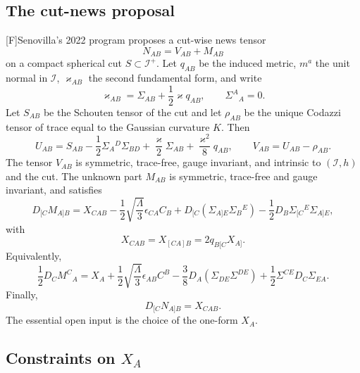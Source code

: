\documentclass[11pt,a4paper]{article}
\newcommand{\scri}{\mathscr{I}}
\newcommand{\statusF}{\textsf{[F]}}
\begin{document}
\subsection{The cut-news proposal}

\statusF Senovilla's 2022 program proposes a cut-wise news tensor
\begin{equation}\label{eq:N-decomposition}
  N_{AB}=V_{AB}+M_{AB}
\end{equation}
on a compact spherical cut \(S\subset\scri^+\).  Let \(q_{AB}\) be the induced metric, \(m^a\) the unit normal in \(\scri\), \(\varkappa_{AB}\) the second fundamental form, and write
\begin{equation}
  \varkappa_{AB}=\Sigma_{AB}+\frac12\varkappa q_{AB},
  \qquad \Sigma^A{}_A=0 .
\end{equation}
Let \(S_{AB}\) be the Schouten tensor of the cut and let \(\rho_{AB}\) be the unique Codazzi tensor of trace equal to the Gaussian curvature \(K\).  Then
\begin{equation}
  U_{AB}
  =
  S_{AB}
  -\frac12\Sigma_A{}^D\Sigma_{BD}
  +\frac{\varkappa}{2}\Sigma_{AB}
  +\frac{\varkappa^2}{8}q_{AB},
  \qquad
  V_{AB}=U_{AB}-\rho_{AB}.
\end{equation}
The tensor \(V_{AB}\) is symmetric, trace-free, gauge invariant, and intrinsic to \((\scri,h)\) and the cut.  The unknown part \(M_{AB}\) is symmetric, trace-free and gauge invariant, and satisfies
\begin{equation}
  D_{[C}M_{A]B}
  =
  X_{CAB}
  -\frac12\sqrt{\frac{\Lambda}{3}}\epsilon_{CA}C_B
  +D_{[C}\!\left(\Sigma_{A]E}\Sigma_B{}^E\right)
  -\frac12 D_B\Sigma_{[C}{}^E\Sigma_{A]E},
\end{equation}
with
\begin{equation}
  X_{CAB}=X_{[CA]B}=2q_{B[C}X_{A]} .
\end{equation}
Equivalently,
\begin{equation}\label{eq:X-source-div}
  \frac12 D_C M^C{}_A
  =
  X_A
  +\frac12\sqrt{\frac{\Lambda}{3}}\epsilon_{AB}C^B
  -\frac38 D_A(\Sigma_{DE}\Sigma^{DE})
  +\frac12\Sigma^{CE}D_C\Sigma_{EA}.
\end{equation}
Finally,
\begin{equation}
  D_{[C}N_{A]B}=X_{CAB}.
\end{equation}
The essential open input is the choice of the one-form \(X_A\).

\subsection{Constraints on \(X_A\)}
\end{document}
